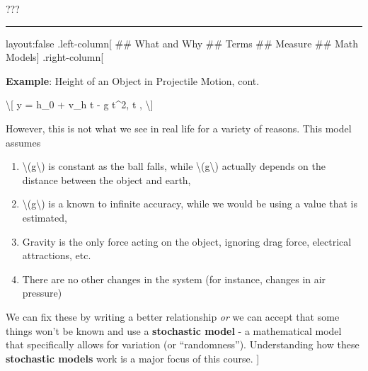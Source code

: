 \documentclass[]{article}
\begin{document}
???

\begin{center}\rule{0.5\linewidth}{\linethickness}\end{center}

layout:false .left-column{[} \#\# What and Why \#\# Terms \#\# Measure
\#\# Math Models{]} .right-column{[}

\textbf{Example}: Height of an Object in Projectile Motion, cont.

\textbackslash{}{[} y = h\_0 + v\_h \cdot t -  g t\^{}2,
\text{   } t , \textbackslash{}{]}

However, this is not what we see in real life for a variety of reasons.
This model assumes

\begin{enumerate}
\def\labelenumi{\arabic{enumi}.}
\item
  \textbackslash{}(g\textbackslash{}) is constant as the ball falls,
  while \textbackslash{}(g\textbackslash{}) actually depends on the
  distance between the object and earth,
\item
  \textbackslash{}(g\textbackslash{}) is a known to infinite accuracy,
  while we would be using a value that is estimated,
\item
  Gravity is the only force acting on the object, ignoring drag force,
  electrical attractions, etc.
\item
  There are no other changes in the system (for instance, changes in air
  pressure)
\end{enumerate}

We can fix these by writing a better relationship \emph{or} we can
accept that some things won't be known and use a \textbf{stochastic
model} - a mathematical model that specifically allows for variation (or
``randomness''). Understanding how these \textbf{stochastic models} work
is a major focus of this course. {]}
\end{document}
